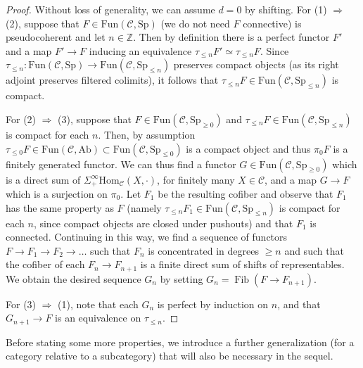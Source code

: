 \documentclass{amsart}
\renewcommand{\hom}{\mathrm{Hom}}
\newcommand{\Sp}{\mathrm{Sp}}
\newcommand{\fun}{\mathrm{Fun}}
\theoremstyle{definition}
\begin{document}
\begin{proof} 
Without loss of generality, we can assume $d =0 $ by shifting. 
For (1) $\Rightarrow$ (2), suppose that $F\in \fun(\mathcal{C}, \Sp)$ (we do not
need $F$ connective) is pseudocoherent and let $n\in\mathbb Z$. Then by definition there is a perfect functor $F'$ and a map $F' \to
F$ inducing an equivalence $\tau_{\leq n} F' \simeq \tau_{\leq n} F$. Since
$\tau_{\leq n}: \fun(\mathcal{C}, \Sp) \to \fun(\mathcal{C}, 
\Sp_{\leq n})$ preserves compact objects (as its right adjoint preserves filtered
colimits), it follows that $\tau_{\leq n} F  \in \fun(\mathcal{C}, 
\Sp_{\leq n})$ is compact. 

For (2) $\Rightarrow$ (3), suppose that $F \in \fun(\mathcal{C},
\Sp_{\geq 0})$ and $\tau_{\leq n} F  \in \fun(\mathcal{C}, 
\Sp_{\leq n})$ is compact for each $n$.  Then, by assumption $\tau_{\leq 0} F  \in \fun(\mathcal{C}, \mathrm{Ab})
\subset \fun(\mathcal{C}, \Sp_{\leq 0})$ is
a compact object and thus $\pi_0 F$ is a finitely generated functor. 
We can thus find a functor $G \in \fun(\mathcal{C}, \Sp_{\geq 0})$ which is a
direct sum of $\Sigma^\infty_+
\hom_{\mathcal{C}}(X, \cdot)$, for finitely many
$X\in\mathcal C$, and a map $G \to F$ which is a surjection on
$\pi_0$. Let $F_1 $ be the resulting cofiber and observe that $F_1$
has the same property as $F$ (namely $\tau_{\leq n} F_1 \in \fun(\mathcal{C}, 
\Sp_{\leq n})$ is compact for each $n$, since compact objects are closed under pushouts) and that $F_1 $ is connected.  
Continuing in this way, we find a sequence of functors $F \to F_1 \to F_2 \to
\dots $ such that 
$F_n$ is concentrated in degrees $\geq n$ and such that the cofiber of each $F_n \to F_{n+1}$ is
a finite direct sum of shifts of representables.  We obtain the desired sequence $G_n$ by setting $G_n=\operatorname{Fib}(F\to F_{n+1})$. 

For (3) $\Rightarrow$ (1), note that each $G_n$ is perfect by induction on $n$,
and that $G_{n+1}\rightarrow F$ is an equivalence on $\tau_{\leq n}$.
\end{proof} 
Before stating some more properties, we introduce a further generalization (for a category relative
to a subcategory) that will also be necessary in the sequel. 
\end{document}
